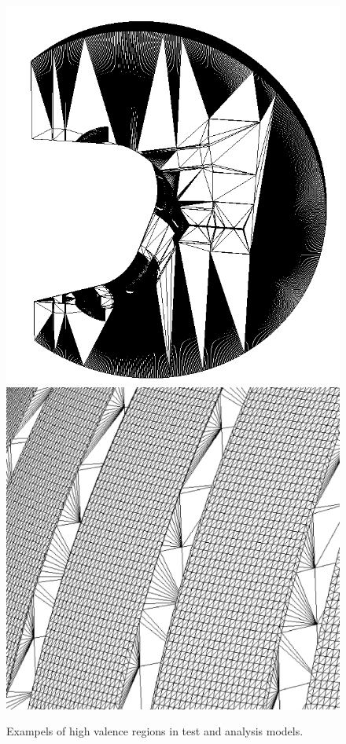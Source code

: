 \documentclass[10pt, a4paper]{article}
\begin{document}
\begin{figure}[H]
  \centering
    \includegraphics[scale=0.2]{iter_sideon.png}
    \includegraphics[scale=0.1]{ds_hv.png}
    \caption{Exampels of high valence regions in test and analysis models.}
\end{figure}
\end{document}

